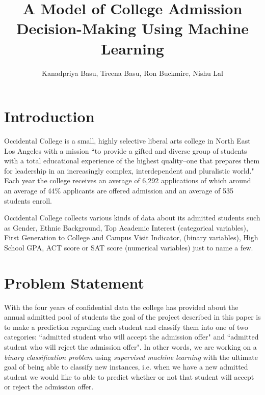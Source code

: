 \documentclass[11pt, oneside]{article}   	%
\title{A Model of College Admission Decision-Making Using Machine Learning}
\author{Kanadpriya Basu, Treena Basu, Ron Buckmire, Nishu Lal}
\begin{document}
\maketitle



\section{Introduction}
\label{sec:intro}
Occidental College is a small, highly selective liberal arts college in North East Los Angeles with a mission ``to provide a gifted and diverse group of students with a total educational experience of the highest quality--one that prepares them for leadership in an increasingly complex, interdependent and pluralistic world." Each year the college receives an average of 6,292 applications of which around an average of 44\%  applicants are offered admission and an average of 535 students enroll.  

Occidental College collects various kinds of data about its admitted students such as Gender,  Ethnic Background, Top Academic Interest 
(categorical variables), First Generation to College and Campus Visit Indicator,  (binary variables), High School GPA, ACT score or SAT score (numerical variables) just to name a few. 


\section{Problem Statement}
\label{sec:problem statement}
With the four years of confidential data the college has provided about the annual admitted pool of students the goal of the project described in this paper is to make a prediction regarding each student and classify them into one of two categories: ``admitted student who will accept the admission offer" and ``admitted student who will reject the admission offer". In other words, we are working on a {\it binary classification problem} using {\it supervised machine learning} with the ultimate goal of being able to classify new instances, i.e. when we have a new admitted student we would like to able to predict whether or not that student will accept or reject the admission offer. 
\end{document}
